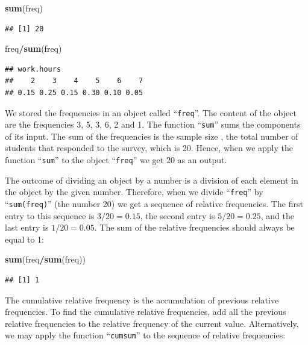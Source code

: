 \documentclass[
]{krantz}
\makeatletter
\newenvironment{Shaded}{\begin{snugshade}}{\end{snugshade}}
\newcommand{\KeywordTok}[1]{\textcolor[rgb]{0.13,0.29,0.53}{\textbf{#1}}}
\newcommand{\NormalTok}[1]{#1}
\newcommand{\OperatorTok}[1]{\textcolor[rgb]{0.81,0.36,0.00}{\textbf{#1}}}
\newenvironment{kframe}{%
\medskip{}
\setlength{\fboxsep}{.8em}
 \def\at@end@of@kframe{}%
 \ifinner\ifhmode%
  \def\at@end@of@kframe{\end{minipage}}%
  \begin{minipage}{\columnwidth}%
 \fi\fi%
 \def\FrameCommand##1{\hskip\@totalleftmargin \hskip-\fboxsep
 \colorbox{shadecolor}{##1}\hskip-\fboxsep
     \hskip-\linewidth \hskip-\@totalleftmargin \hskip\columnwidth}%
 \MakeFramed {\advance\hsize-\width
   \@totalleftmargin\z@ \linewidth\hsize
   \@setminipage}}%
 {\par\unskip\endMakeFramed%
 \at@end@of@kframe}
\renewenvironment{Shaded}{\begin{kframe}}{\end{kframe}}
\theoremstyle{definition}
\theoremstyle{definition}
\theoremstyle{definition}
\theoremstyle{remark}
\makeatother
\begin{document}
\begin{Shaded}
\begin{Highlighting}[]
\KeywordTok{sum}\NormalTok{(freq)}
\end{Highlighting}
\end{Shaded}

\begin{verbatim}
## [1] 20
\end{verbatim}

\begin{Shaded}
\begin{Highlighting}[]
\NormalTok{freq}\OperatorTok{/}\KeywordTok{sum}\NormalTok{(freq)}
\end{Highlighting}
\end{Shaded}

\begin{verbatim}
## work.hours
##    2    3    4    5    6    7 
## 0.15 0.25 0.15 0.30 0.10 0.05
\end{verbatim}

We stored the frequencies in an object called ``\texttt{freq}''. The content of the object are the frequencies 3, 5, 3, 6, 2 and 1. The function ``\texttt{sum}'' sums the components of its input. The sum of the frequencies is the sample size , the total number of students that responded to the survey, which is 20. Hence, when we apply the function ``\texttt{sum}'' to the object ``\texttt{freq}'' we get 20 as an output.

The outcome of dividing an object by a number is a division of each element in the object by the given number. Therefore, when we divide ``\texttt{freq}'' by ``\texttt{sum(freq)}'' (the number 20) we get a sequence of relative frequencies. The first entry to this sequence is \(3/20 = 0.15\), the second entry is \(5/20 = 0.25\), and the last entry is \(1/20 = 0.05\). The sum of the relative frequencies should always be equal to 1:

\begin{Shaded}
\begin{Highlighting}[]
\KeywordTok{sum}\NormalTok{(freq}\OperatorTok{/}\KeywordTok{sum}\NormalTok{(freq))}
\end{Highlighting}
\end{Shaded}

\begin{verbatim}
## [1] 1
\end{verbatim}

The cumulative relative frequency is the accumulation of previous relative frequencies. To find the cumulative relative frequencies, add all the previous relative frequencies to the relative frequency of the current value. Alternatively, we may apply the function ``\texttt{cumsum}'' to the sequence of relative frequencies:
\end{document}
